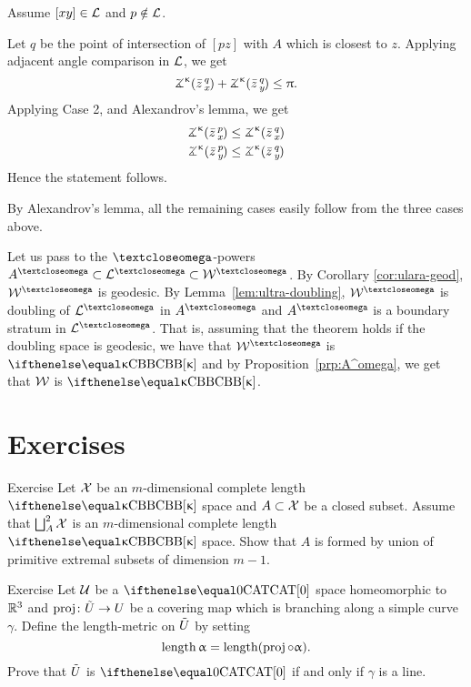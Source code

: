 Assume $[xy]\in\spc{L}$ and $p\notin\spc{L}$.

Let $q$ be the point of intersection of $[pz]$ with $A$ which is closest to $z$.
Applying adjacent angle comparison in $\spc{L}$,
we get 
\[\angk\kappa {\bar z} q x
+\angk\kappa {\bar z} q y\le \pi.\]
Applying Case 2, and Alexandrov's lemma,
we get
\begin{align*}
\angk\kappa {\bar z} p x&\le \angk\kappa {\bar z} q x
\\
\angk\kappa {\bar z} p y&\le \angk\kappa {\bar z} q y
\end{align*}
Hence the statement follows.

 By Alexandrov's lemma,
all the remaining cases easily follow from the three cases above.

Let us pass to the $\o$-powers $A^\o\subset \spc{L}^\o\subset\spc{W}^\o$.
By Corollary \ref{cor:ulara-geod}, $\spc{W}^\o$ is geodesic.
By Lemma~\ref{lem:ultra-doubling},
 $\spc{W}^\o$ is doubling of $\spc{L}^\o$ in $A^\o$ and $A^\o$ is a boundary stratum in $\spc{L}^\o$.
That is, assuming that the theorem holds if the doubling space is geodesic, we have that $\spc{W}^\o$ is $\Alex\kappa$ and by Proposition~\ref{prp:A^omega}, we get that $\spc{W}$ is $\Alex\kappa$.
\qeds









\section{Exercises}



\begin{thm}{Exercise}
Let $\spc{X}$ be an $m$-dimensional complete length $\Alex\kappa$ space and $A\subset \spc{X}$ be a closed subset.
Assume that  $\Doubling{A}{\spc{X}}$ is an $m$-dimensional complete length $\Alex\kappa$ space. 
Show that $A$ is formed by union of primitive extremal subsets of dimension $m-1$.
\end{thm}

\begin{thm}{Exercise}
Let $\spc{U}$ be a $\CAT0$ space homeomorphic to $\RR^3$ and 
$\proj\:\~U\to U$ be a covering map which is branching along a simple curve $\gamma$.
Define the length-metric on $\~U$ by setting 
\[\length\alpha=\length(\proj\circ\alpha).\]
Prove that $\~U$ is $\CAT0$ if and only if $\gamma$ is a line.
\end{thm}


